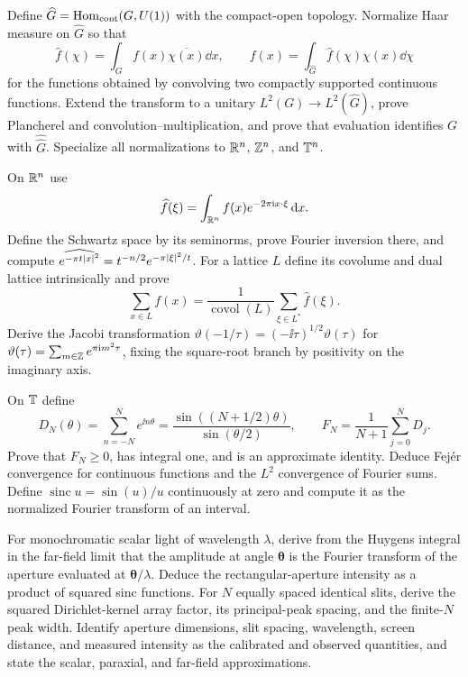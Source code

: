 \begin{exercise}
Define $\widehat G=\operatorname{Hom}_{\mathrm{cont}}(G,U(1))$ with the compact-open
topology.  Normalize Haar measure on $\widehat G$ so that
\[
 \widehat f(\chi)=\int_G f(x)\overline{\chi(x)}\dd x,
 \qquad
 f(x)=\int_{\widehat G}\widehat f(\chi)\chi(x)\dd\chi
\]
for the functions obtained by convolving two compactly supported continuous
functions.  Extend the transform to a unitary
$L^2(G)\to L^2(\widehat G)$, prove Plancherel and convolution--multiplication,
and prove that evaluation identifies $G$ with $\widehat{\widehat G}$.
Specialize all normalizations to $\mathbb R^n$, $\mathbb Z^n$, and $\mathbb T^n$.
\end{exercise}

\begin{exercise}
On $\mathbb R^n$ use
\[
 \widehat f(\xi)=\int_{\mathbb R^n}f(x)e^{-2\pi\mathrm i x\cdot\xi}\,\mathrm d x.
\]
Define the Schwartz space by its seminorms, prove Fourier inversion there,
and compute $\widehat{e^{-\pi t\left\lvert x\right\rvert^2}}=t^{-n/2}
e^{-\pi\left\lvert \xi\right\rvert^2/t}$.  For a lattice $L$ define its covolume and dual
lattice intrinsically and prove
\[
 \sum_{x\in L}f(x)=\frac1{\operatorname{covol}(L)}
 \sum_{\xi\in L^*}\widehat f(\xi).
\]
Derive the Jacobi transformation
$\vartheta(-1/\tau)=(-\ii\tau)^{1/2}\vartheta(\tau)$ for
$\vartheta(\tau)=\sum_{m\in\mathbb Z}e^{\pi\mathrm i m^2\tau}$, fixing the square-root
branch by positivity on the imaginary axis.
\end{exercise}

\begin{exercise}
On $\mathbb T$ define
\[
 D_N(\theta)=\sum_{n=-N}^Ne^{\ii n\theta}
 =\frac{\sin((N+1/2)\theta)}{\sin(\theta/2)},\qquad
 F_N=\frac1{N+1}\sum_{j=0}^ND_j .
\]
Prove that $F_N\ge0$, has integral one, and is an approximate identity.
Deduce Fej\'er convergence for continuous functions and the $L^2$ convergence
of Fourier sums.  Define $\operatorname{sinc}u=\sin(u)/u$ continuously at
zero and compute it as the normalized Fourier transform of an interval.
\end{exercise}

\begin{exercise}
For monochromatic scalar light of wavelength $\lambda$, derive from the
Huygens integral in the far-field limit that the amplitude at angle
$\boldsymbol\theta$ is the Fourier transform of the aperture evaluated at
$\boldsymbol\theta/\lambda$.  Deduce the rectangular-aperture intensity as a
product of squared sinc functions.  For $N$ equally spaced identical slits,
derive the squared Dirichlet-kernel array factor, its principal-peak spacing,
and the finite-$N$ peak width.  Identify aperture dimensions, slit spacing,
wavelength, screen distance, and measured intensity as the calibrated and
observed quantities, and state the scalar, paraxial, and far-field
approximations.
\end{exercise}

